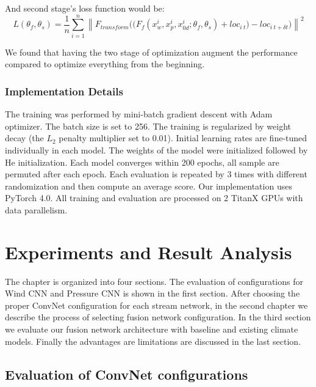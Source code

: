 \begin{enumerate}[leftmargin=2em]
	And second stage's loss function would be:
	\begin{equation}
	\label{eq_fusion_2}
	L(\theta_{f}, \theta_{s}) = \frac{1}{n}\sum_{i=1}^{n} \left \| {F_{transform}((F_{f}(x_w^i, x_p^i, x_{0d}^i; \theta_{f}, \theta_{s})} + loc_{i\ t} ) - loc_{i\ t+\delta t} ) \right \| ^2
	\end{equation}
	
	 We found that having the two stage of optimization augment the performance compared to optimize everything from the beginning. 
	
	
	
\end{enumerate}



\subsection{Implementation Details}

The training was performed by mini-batch gradient descent with Adam optimizer. The batch size is set to 256. The training is regularized by weight decay (the $L_2$ penalty multiplier set to 0.01). Initial learning rates are fine-tuned individually in each model. The weights of the model were initialized followed by He initialization\cite{he2015delving}. Each model converges within 200 epochs, all sample are permuted after each epoch. Each evaluation is repeated by 3 times with different randomization and then compute an average score. Our implementation uses PyTorch 4.0. All training and evaluation are processed on 2 TitanX GPUs with data parallelism\cite{KRIZHEVSKY2014}. 


\chapter{Experiments and Result Analysis}
The chapter is organized into four sections. The evaluation of configurations for Wind CNN and Pressure CNN is shown in the first section. After choosing the proper ConvNet configuration for each stream network, in the second chapter we describe the process of selecting fusion network configuration. In the third section we evaluate our fusion network architecture with baseline and existing climate models. Finally the advantages are limitations are discussed in the last section.  

\section{Evaluation of ConvNet configurations}

